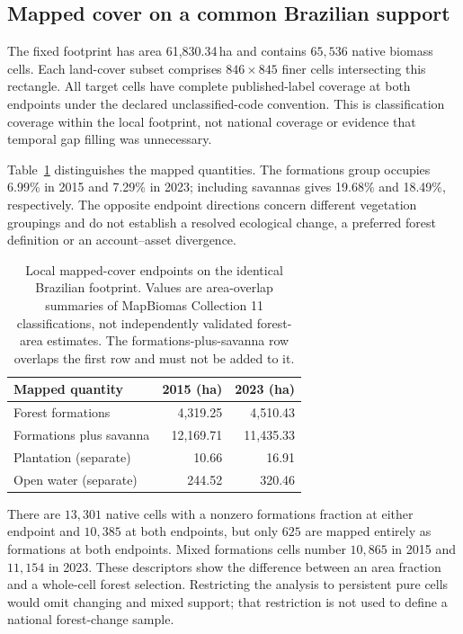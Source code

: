 \documentclass[11pt,a4paper]{article}
\begin{document}
\subsection{Mapped cover on a common Brazilian support}
The fixed footprint has area 61,830.34\,ha and contains $65{,}536$ native biomass cells. Each land-cover subset comprises $846\times845$ finer cells intersecting this rectangle. All target cells have complete published-label coverage at both endpoints under the declared unclassified-code convention. This is classification coverage within the local footprint, not national coverage or evidence that temporal gap filling was unnecessary.

Table~\ref{tab:brazil_cover} distinguishes the mapped quantities. The formations group occupies 6.99\% in 2015 and 7.29\% in 2023; including savannas gives 19.68\% and 18.49\%, respectively. The opposite endpoint directions concern different vegetation groupings and do not establish a resolved ecological change, a preferred forest definition or an account--asset divergence.

\begin{table}[htbp]
\centering\small
\caption{Local mapped-cover endpoints on the identical Brazilian footprint. Values are area-overlap summaries of MapBiomas Collection 11 classifications, not independently validated forest-area estimates. The formations-plus-savanna row overlaps the first row and must not be added to it.}\label{tab:brazil_cover}
\begin{tabular}{lrr}
\toprule
Mapped quantity & 2015 (ha) & 2023 (ha)\\\midrule
Forest formations & 4,319.25 & 4,510.43 \\
Formations plus savanna & 12,169.71 & 11,435.33 \\
Plantation (separate) & 10.66 & 16.91 \\
Open water (separate) & 244.52 & 320.46 \\
\bottomrule
\end{tabular}
\end{table}

There are $13{,}301$ native cells with a nonzero formations fraction at either endpoint and $10{,}385$ at both endpoints, but only $625$ are mapped entirely as formations at both endpoints. Mixed formations cells number $10{,}865$ in 2015 and $11{,}154$ in 2023. These descriptors show the difference between an area fraction and a whole-cell forest selection. Restricting the analysis to persistent pure cells would omit changing and mixed support; that restriction is not used to define a national forest-change sample.
\end{document}

